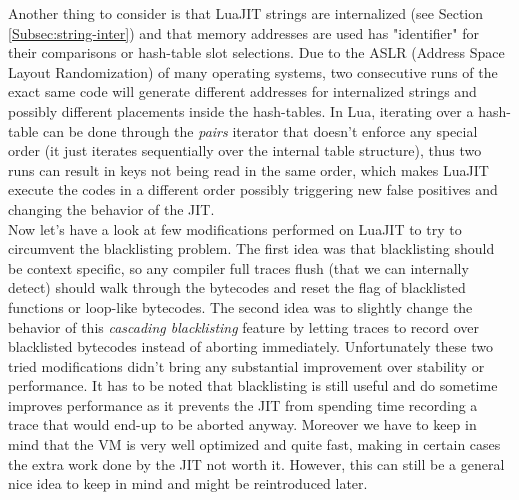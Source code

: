 Another thing to consider is that LuaJIT strings are internalized (see
Section \ref{Subsec:string-inter}) and that memory addresses are used has
"identifier" for their comparisons or hash-table slot selections.
Due to the ASLR (Address Space Layout Randomization) of many operating systems,
two consecutive runs of the exact same code will generate different addresses for
internalized strings and possibly different placements inside the hash-tables.
In Lua,
iterating over a hash-table can be done through the \emph{pairs} iterator that
doesn't enforce any special order (it just iterates sequentially over the internal
table structure), thus two runs can result in keys not being read in the same order,
which makes LuaJIT execute the codes in a different order possibly triggering new
false positives and changing the behavior of the JIT.\\

Now let's have a look at few modifications performed on LuaJIT to try
to circumvent the blacklisting problem. The first idea was that blacklisting
should be context specific, so any compiler full traces flush (that we can
internally detect) should walk through the bytecodes and reset the flag of
blacklisted functions or loop-like bytecodes. The second idea was to slightly
change the behavior of this \emph{cascading blacklisting} feature by letting
traces to record over blacklisted bytecodes instead of aborting immediately.
Unfortunately these two tried modifications didn't bring any substantial
improvement over stability or performance. It has to be noted that
blacklisting is still useful and do sometime improves performance as it
prevents the JIT from spending time recording a trace that would end-up to be aborted
anyway. Moreover we have to keep in mind that the VM is very well optimized and
quite fast, making in certain cases the extra work done by the JIT not worth it.
However, this can still be a general nice idea to keep in mind and might be
reintroduced later.
